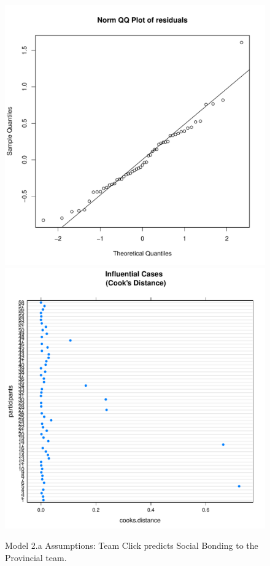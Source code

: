 \begin{figure}[htbp]
    \includegraphics[scale =.4]{images/TEM2TeamQQNorm.pdf}
    \includegraphics[scale =.4]{images/TEM2TeamCooksD.pdf}
    \caption{Model 2.a Assumptions: Team Click predicts Social Bonding to the Provincial team.}
    \label{fig:M2TeamAssumptions}
\end{figure}


